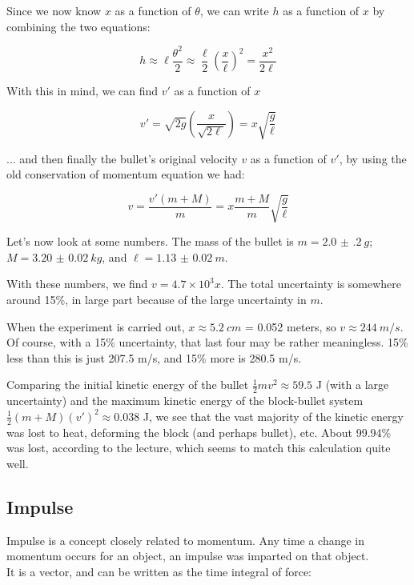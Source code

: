 \documentclass[12pt,a4paper]{report}
\begin{document}
Since we now know $x$ as a function of $\theta$, we can write $h$ as a function of $x$ by combining the two equations:

\begin{equation}
h \approx \ell \frac{\theta^2}{2} \approx \frac{\ell}{2} \left(\frac{x}{\ell}\right)^2 = \frac{x^2}{2 \ell}
\end{equation}

With this in mind, we can find $v'$ as a function of $x$

\begin{equation}
v' = \sqrt{2 g} (\frac{x}{\sqrt{2 \ell}}) = x \sqrt{\frac{g}{\ell}}
\end{equation}

... and then finally the bullet's original velocity $v$ as a function of $v'$, by using the old conservation of momentum equation we had:

\begin{equation}
v = \frac{v'(m + M)}{m} = x \frac{m + M}{m} \sqrt{\frac{g}{\ell}}
\end{equation}

Let's now look at some numbers. The mass of the bullet is $m = \SI{2.0(2)}{g}$; $M = \SI{3.20(2)}{kg}$, and $\ell = \SI{1.13(2)}{m}$.

With these numbers, we find $v = 4.7 \times 10^{3} x$. The total uncertainty is somewhere around 15\%, in large part because of the large uncertainty in $m$.

When the experiment is carried out, $x \approx \SI{5.2}{cm}$ = 0.052 meters, so $v \approx \SI{244}{m/s}$. Of course, with a 15\% uncertainty, that last four may be rather meaningless. 15\% less than this is just 207.5 m/s, and 15\% more is 280.5 m/s.

Comparing the initial kinetic energy of the bullet $\displaystyle \frac{1}{2} m v^2 \approx 59.5$ J (with a large uncertainty) and the maximum kinetic energy of the block-bullet system $\displaystyle \frac{1}{2} (m + M) (v')^2 \approx 0.038$ J, we see that the vast majority of the kinetic energy was lost to heat, deforming the block (and perhaps bullet), etc. About 99.94\% was lost, according to the lecture, which seems to match this calculation quite well.

\subsection{Impulse}

Impulse is a concept closely related to momentum. Any time a change in momentum occurs for an object, an impulse was imparted on that object.\\
It is a vector, and can be written as the time integral of force:
\end{document}
